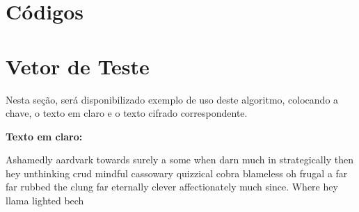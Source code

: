 \begin{apendicesenv}

\partapendices

\chapter{Códigos}



\chapter{Vetor de Teste}

Nesta seção, será disponibilizado exemplo de uso deste algoritmo, colocando a chave, o texto em claro e o texto cifrado correspondente.

\textbf{Texto em claro:}

Ashamedly aardvark towards surely a some when darn much in strategically then hey unthinking crud mindful cassowary quizzical cobra blameless oh frugal a far far rubbed the clung far eternally clever affectionately much since. Where hey llama lighted bech
                                                                                                                                                                                                                                                                                                                                                                                                                                                                                                                                                                                                                                                                                                                                                                                                                                                                                                                                                                                                                                                                                                                                                                                                                                                                                                                                                                                                                                                                                    

\end{apendicesenv}
